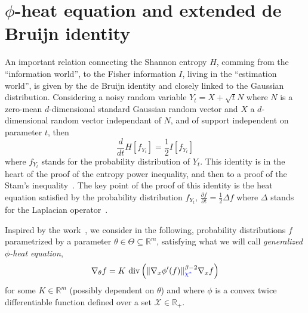 \documentclass[english,sort&compress]{elsarticle}
\theoremstyle{definition}
\theoremstyle{plain}
\theoremstyle{plain}
\def\Rset{\mathbb{R}}
\def\X{\mathcal{X}}
\def\div{\operatorname{div}}
\begin{document}

\section{$\phi$-heat equation and extended de Bruijn identity}
\label{sec:deBruijn}


An  important relation  connecting the  Shannon  entropy $H$,  comming from  the
``information world'', to the Fisher information $I$, living in the ``estimation
world'', is given  by the de Bruijn identity and closely  linked to the Gaussian
distribution. Considering a  noisy random variable $Y_t = X  + \sqrt{t} N$ where
$N$ is  a zero-mean  $d$-dimensional standard Gaussian  random vector and  $X$ a
$d$-dimensional random vector independant of  $N$, and of support independent on
parameter  $t$,  then $$\frac{d}{dt}  H[f_{Y_t}]  =  \frac12 I[f_{Y_t}]$$  where
$f_{Y_t}$ stands for the probability  distribution of $Y_t$. This identity is in
the heart of the  proof of the entropy power inequality, and  then to a proof of
the  Stam's inequality~\cite{CovTho06}.  The  key  point of  the  proof of  this
identity  is  the  heat  equation  satisfied  by  the  probability  distribution
$f_{Y_t}$,  $\frac{\partial f}{\partial t}  = \frac12  \Delta f$  where $\Delta$
stands for the Laplacian operator~\cite{Wid75}.

Inspired by the work~\cite{Ber13:08},  we consider in the following, probability
distributions  $f$ parametrized  by  a parameter  $\theta  \in \Theta  \subseteq
\Rset^m$, satisfying what we will call {\em generalized $\phi$-heat equation},
%
\begin{equation}
\label{eq:phi-heat_equation}
\nabla_\theta f = K \, \div\left( \| \nabla_x \phi'(f) \|_{\SZ{\chi^*}}^{\beta-2}
\nabla_x f \right)
\end{equation}
%
for some $K \in \Rset^m$ (possibly  dependent on $\theta$) and where $\phi$ is a
convex  twice differentiable  function  defined  over a  set  $\X \in  \Rset_+$.
\end{document}
